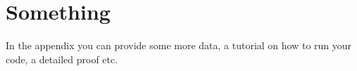 
\chapter{Something}\label{sec:something}

In the appendix you can provide some more data, a tutorial on how to run your code, a detailed proof etc.

\cleardoublepage